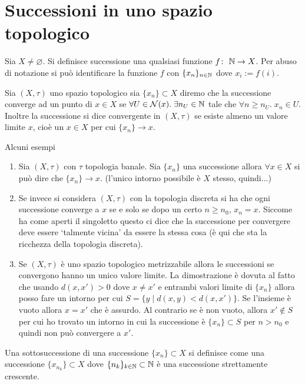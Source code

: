 \section{Successioni in uno spazio topologico}
\begin{definition}
	Sia $X \neq \varnothing$. Si definisce successione una qualsiasi funzione $f \colon\ \mathbb{N} \rightarrow X$. Per abuso di notazione si può identificare la funzione $f$ con $\{x_n\}_{n\in\mathbb{N}}$ dove $x_i := f(i)$.
\end{definition}

\begin{definition}
	Sia $(X, \tau)$ uno spazio topologico sia $\{x_n\} \subset X$ diremo che la successione converge ad un punto di $x \in X$ se $\forall U \in \mathcal{N}(x) . \; \exists n_U \in \mathbb{N}$ tale che $\forall n \ge n_U . \; x_n \in U$. Inoltre la successione si dice convergente in $(X,\tau)$ se esiste almeno un valore limite $x$, cioè un $x \in X$ per cui $\{x_n\} \rightarrow x$.
\end{definition}

Alcuni esempi 
\begin{enumerate}
	\item Sia $(X,\tau)$ con $\tau$ topologia banale. Sia $\{x_n\}$ una successione allora $\forall x \in X$ si può dire che $\{x_n\} \rightarrow x$. (l'unico intorno possibile è $X$ stesso, quindi...)
	\item Se invece si considera $(X,\tau)$ con la topologia discreta si ha che ogni successione converge a $x$ se e solo se dopo un certo $n \ge n_0$, $x_n = x$. Siccome ha come aperti il singoletto questo ci dice che la successione per convergere deve essere `talmente vicina' da essere la stessa cosa (è qui che sta la ricchezza della topologia discreta).
 	\item Se $(X,\tau)$ è uno spazio topologico metrizzabile allora le successioni se convergono hanno un unico valore limite. La dimostrazione è dovuta al fatto che usando $d(x,x') > 0$ dove $x \neq x' $ e entrambi valori limite di $\{x_n\}$ allora posso fare un intorno per cui $S = \{y\; |\; d(x, y) < d(x,x')\}$. Se l'insieme è vuoto allora $x = x'$ che è assurdo. Al contrario se è non vuoto, allora $x' \not\in S$ per cui ho trovato un intorno in cui la successione è $\{x_n\} \subset S$ per $n > n_0$ e quindi non può convergere a $x'$. 
\end{enumerate}

\begin{definition}
	Una sottosuccessione di una successione $\{x_n\} \subset X$ si definisce come una successione $\{x_{n_k}\} \subset X$ dove $\{n_k\}_{k\in \mathbb{N}} \subset \mathbb{N}$ è una successione strettamente crescente. 
\end{definition}

